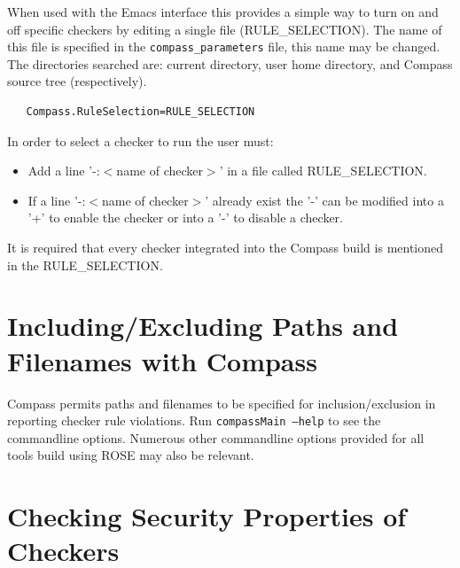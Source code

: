    When used with the Emacs interface this provides a simple way to turn on and off
specific checkers by editing a single file (RULE\_SELECTION).  The name of this
file is specified in the {\tt compass\_parameters} file, this name may be changed.
The directories searched are: current directory, user home directory, and Compass
source tree (respectively).

\begin{verbatim}
   Compass.RuleSelection=RULE_SELECTION
\end{verbatim}


In order to select a checker to run the user must:
\begin{itemize}
   \item Add a line '-:$<$name of checker$>$' in a file called RULE\_SELECTION. 
   \item If a line  '-:$<$name of checker$>$' already exist the '-' can be modified into
a '+' to enable the checker or into a '-' to disable a checker.
\end{itemize}
It is required that every checker integrated into the Compass build is mentioned in
the RULE\_SELECTION.


\section{Including/Excluding Paths and Filenames with Compass}

    Compass permits paths and filenames to be specified for inclusion/exclusion
in reporting checker rule violations.  Run {\tt compassMain --help} to see
the commandline options.  Numerous other commandline options provided for all
tools build using ROSE may also be relevant.



\section{Checking Security Properties of Checkers}
\label{sec:compass_verify}

